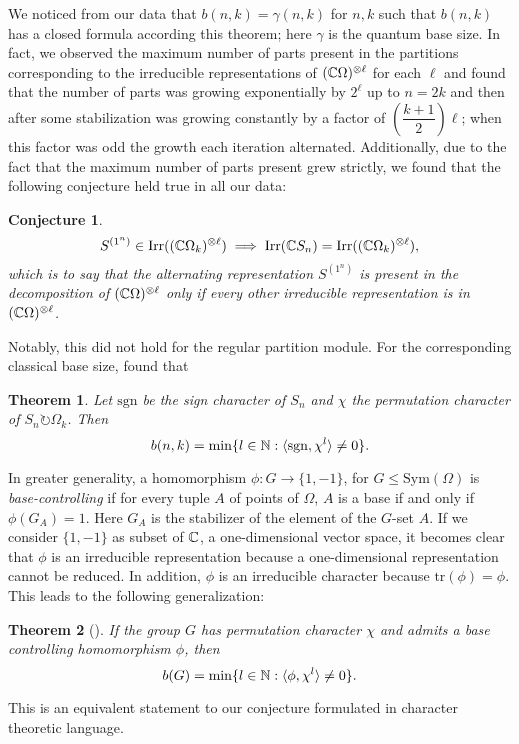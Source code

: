 \documentclass[12pt,twoside]{reedthesis}
\theoremstyle{plain}   %
\newtheorem{thm}{Theorem}[section] %
\newtheorem{conj}{Conjecture}[section]
\theoremstyle{definition}
\theoremstyle{remark}
\numberwithin{equation}{section}
\def\tr{\mathrm{tr}}
\def\irr{\mathrm{Irr}}
\def\acts{\circlearrowright} %
\begin{document}
We noticed from our data that $b(n,k) = \gamma(n,k)$ for $n,k$ such that $b(n,k)$ has a closed formula according this theorem; here $\gamma$ is the quantum base size.
In fact, we observed the maximum number of parts present in the partitions corresponding to the irreducible representations of $(\mathbb{C} \Omega)^{\otimes \ell}$ for each $\ell$ and found that the number
of parts was growing exponentially by $2^\ell$ up to $n = 2k$ and then after some stabilization was growing constantly by a factor of $(\dfrac{k+1}{2})\ell$; when this factor was odd the growth each iteration alternated.
Additionally, due to the fact that the maximum number of parts present grew strictly, we found that the following conjecture held true in all our data:
\begin{conj}
  \[S^{(1^n)} \in \irr((\CC \Omega_k)^{\otimes \ell}) \implies \irr(\CC  S_n) = \irr((\CC \Omega_k)^{\otimes \ell}),\]
  which is to say that the alternating representation $S^{(1^n)}$ is present in the decomposition of $(\mathbb{C} \Omega)^{\otimes \ell}$ only if every other irreducible representation is in $(\mathbb{C} \Omega)^{\otimes \ell}$.
\end{conj}
Notably, this did not hold for the regular partition module.
For the corresponding classical base size, \cite{valle24} found that
\begin{thm}
  Let $\mathrm{sgn}$ be the sign character of $S_n$ and $\chi$ the permutation character of $S_n \acts \Omega_k$. Then
  \[ b(n,k) = \min \{ l \in \mathbb{N}: \langle \mathrm{sgn}, \chi^l \rangle \neq 0 \}.\]
\end{thm}
In greater generality, a homomorphism $\phi: G \to \{1,-1\}$, for $G \leq \mathrm{Sym}(\Omega)$ is \emph{base-controlling} if for every tuple $A$ of points of $\Omega$, $A$ is a base if and only if $\phi(G_A) = 1$.
Here $G_A$ is the stabilizer of the element of the $G$-set $A$.
If we consider $\{1,-1\}$ as subset of $\mathbb{C}$, a one-dimensional vector space, it becomes clear that $\phi$ is an irreducible representation because a one-dimensional representation cannot be reduced.
In addition, $\phi$ is an irreducible character because $\tr(\phi) = \phi$. This leads to the following generalization:
\begin{thm}[{\cite{valle24}}]
  If the group $G$ has permutation character $\chi$ and admits a base controlling homomorphism $\phi$, then
  \[  b(G) = \min \{ l \in \mathbb{N}: \langle \phi, \chi^l \rangle \neq 0 \}.\]
\end{thm}
This is an equivalent statement to our conjecture formulated in character theoretic language.
\end{document}
